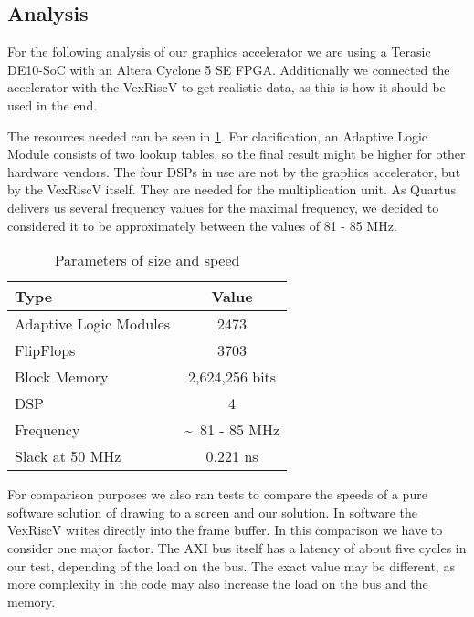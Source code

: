 \subsection{Analysis}
For the following analysis of our graphics accelerator we are using a Terasic DE10-SoC with an Altera Cyclone 5 SE FPGA. Additionally we connected the accelerator with the VexRiscV to get realistic data, as this is how it should be used in the end.

The resources needed can be seen in \cref{tab:pmem}. For clarification, an Adaptive Logic Module consists of two lookup tables, so the final result might be higher for other hardware vendors. The four DSPs in use are not by the graphics accelerator, but by the VexRiscV itself. They are needed for the multiplication unit. As Quartus  delivers us several frequency values for the maximal frequency, we decided to considered it to be approximately between the values of 81 - 85 MHz.

\begin{table}[H]
	\begin{center}
		\begin{tabular}{p{5cm}|c}
			\toprule
			\textbf{Type} & \textbf{Value} 
			\\\midrule
			Adaptive Logic Modules & 2473                     \\ 
			FlipFlops              & 3703                      \\ 
			Block Memory           & 2,624,256 bits             \\ 
			DSP                    & 4                           \\ 
			Frequency              & \textasciitilde ~81 - 85 MHz \\
			Slack at 50 MHz        & 0.221 ns                      \\
			\bottomrule
		\end{tabular}
		\caption{Parameters of size and speed}
		\label{tab:pmem}
	\end{center}
\end{table}

For comparison purposes we also ran tests to compare the speeds of a pure software solution of drawing to a screen and our solution. In software the VexRiscV writes directly into the frame buffer. In this comparison we have to consider one major factor. The AXI bus itself has a latency of about five cycles in our test, depending of the load on the bus. The exact value may be different, as more complexity in the code may also increase the load on the bus and the memory. 

